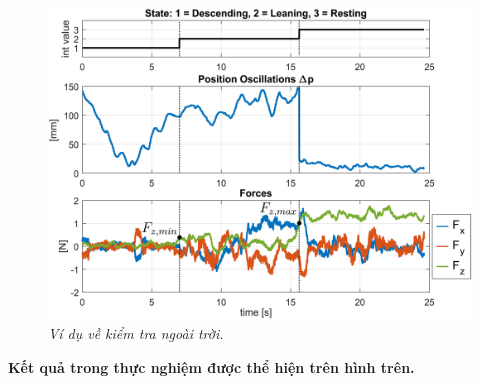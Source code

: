 \documentclass[12pt,a4paper]{article}
\begin{document}
\begin{figure}[ht!]
    \centering
    \includegraphics[scale = 0.6]{hinh 6}
    \caption{\textit{Ví dụ về kiểm tra ngoài trời.}}
    \label{fig6}
\end{figure}
\begin{center}
    \textbf{Kết quả trong thực nghiệm được thể hiện trên hình trên.}
\end{center}
\newpage
\end{document}
